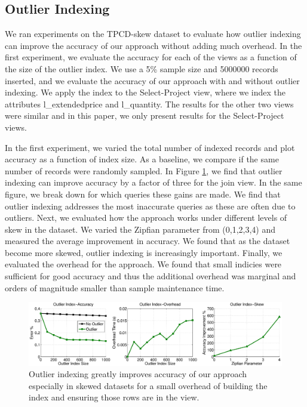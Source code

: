 \subsection{Outlier Indexing}
We ran experiments on the TPCD-skew dataset to evaluate how outlier indexing can improve the accuracy of our approach without adding much overhead.
In the first experiment, we evaluate the accuracy for each of the views as a function of the size of the outlier index. 
We use a 5\% sample size and 5000000 records inserted, and we evaluate the accuracy of our approach with and without outlier indexing.
We apply the index to the Select-Project view, where we index the attributes l\_extendedprice and l\_quantity.
The results for the other two views were similar and in this paper, we only present results for the Select-Project views.

In the first experiment, we varied the total number of indexed records and plot accuracy as a function of index size.
As a baseline, we compare if the same number of records were randomly sampled.
In Figure \ref{exp7outlier}, we find that outlier indexing can improve accuracy by a factor of three for the join view. 
In the same figure, we break down for which queries these gains are made. 
We find that outlier indexing addresses the most inaccurate queries as these are often due to outliers. 
Next, we evaluated how the approach works under different levels of skew in the dataset. We varied the Zipfian parameter from (0,1,2,3,4) and measured the average improvement in accuracy. 
We found that as the dataset become more skewed, outlier indexing is increasingly important.
Finally, we evaluated the overhead for the approach. 
We found that small indicies were sufficient for good accuracy and thus the additional overhead was marginal and orders of magnitude smaller than sample maintenance time.

\begin{figure}[ht!]
\label{exp7outlier}
\hspace{-4em}
\includegraphics[scale=0.21]{exp/exp6-outlier-full.eps}
 \caption{Outlier indexing greatly improves accuracy of our approach especially in skewed datasets for a small overhead of building the index and ensuring those rows are in the view.}
\end{figure}

